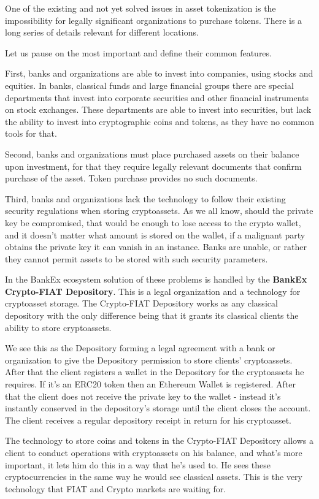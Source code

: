 \documentclass{article}
\begin{document}
\begin{multicols}{2}
One of the existing and not yet solved issues in asset tokenization is the impossibility for legally significant organizations to purchase tokens. There is a long series of details relevant for different locations.

Let us pause on the most important and define their common features.

First, banks and organizations are able to invest into companies, using stocks and equities. In banks, classical funds and large financial groups there are special departments that invest into corporate securities and other financial instruments on stock exchanges. These departments are able to invest into securities, but lack the ability to invest into cryptographic coins and tokens, as they have no common tools for that.

Second, banks and organizations must place purchased assets on their balance upon investment, for that they require legally relevant documents that confirm purchase of the asset. Token purchase provides no such documents. 

Third, banks and organizations lack the technology to follow their existing security regulations when storing cryptoassets. As we all know, should the private key be compromised, that would be enough to lose access to the crypto wallet, and it doesn’t matter what amount is stored on the wallet, if a malignant party obtains the private key it can vanish in an instance. Banks are unable, or rather they cannot permit assets to be stored with such security parameters. 

In the BankEx ecosystem solution of these problems is handled by the \textbf{BankEx Crypto-FIAT Depository}. This is a legal organization and a technology for cryptoasset storage. The Crypto-FIAT Depository works as any classical depository with the only difference being that it grants its classical clients the ability to store cryptoassets.

We see this as the Depository forming a legal agreement with a bank or organization to give the Depository permission to store clients’ cryptoassets. After that the client registers a wallet in the Depository for the cryptoassets he requires. If it’s an ERC20 token then an Ethereum Wallet is registered. After that the client does not receive the private key to the wallet - instead it’s instantly conserved in the depository’s storage until the client closes the account. The client receives a regular depository receipt in return for his cryptoasset.

The technology to store coins and tokens in the Crypto-FIAT Depository allows a client to conduct operations with cryptoassets on his balance, and what’s more important, it lets him do this in a way that he’s used to. He sees these cryptocurrencies in the same way he would see classical assets. This is the very technology that FIAT and Crypto markets are waiting for.


\end{multicols}
\end{document}
